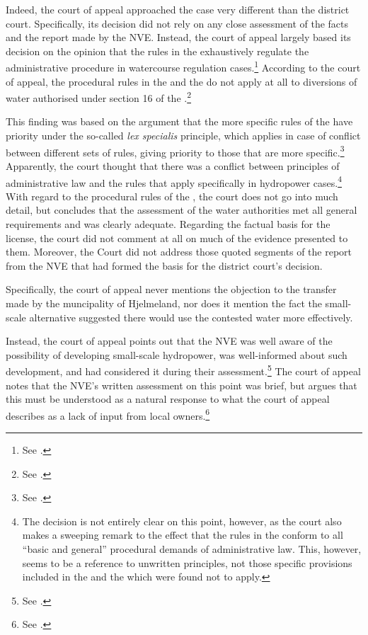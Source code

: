 Indeed, the court of appeal approached the case very different than the district court. Specifically, its decision did not rely on any close assessment of the facts and the report made by the NVE. Instead, the court of appeal largely based its decision on the opinion that the rules in the \cite{wra17} exhaustively regulate the administrative procedure in watercourse regulation cases.\footnote{See \cite[7]{jorpeland11a}.} According to the court of appeal, the procedural rules in the \cite{ea59} and the \cite{paa67} do not apply at all to diversions of water authorised under section 16 of the \cite{wra17}.\footnote{See \cite[7]{jorpeland11a}.} 

This finding was based on the argument that the more specific rules of the \cite{wra17} have priority under the so-called {\it lex specialis} principle, which applies in case of conflict between different sets of rules, giving priority to those that are more specific.\footnote{See \cite[7]{jorpeland11a}.} Apparently, the court thought that there was a conflict between principles of administrative law and the rules that apply specifically in hydropower cases.\footnote{The decision is not entirely clear on this point, however, as the court also makes a sweeping remark to the effect that the rules in the \cite{wra17} conform to all ``basic and general'' procedural demands of administrative law. This, however, seems to be a reference to unwritten principles, not those specific provisions included in the \cite{paa67} and the \cite{ea59} which were found not to apply.} With regard to the procedural rules of the \cite{wra17}, the court does not go into much detail, but concludes that the assessment of the water authorities met all general requirements and was clearly adequate. Regarding the factual basis for the license, the court did not comment at all on much of the evidence presented to them. Moreover, the Court did not address those quoted segments of the report from the NVE that had formed the basis for the district court's decision.

Specifically, the court of appeal never mentions the objection to the transfer made by the muncipality of Hjelmeland, nor does it mention the fact the small-scale alternative suggested there would use the contested water more effectively.

Instead, the court of appeal points out that the NVE was well aware of the possibility of developing small-scale hydropower, was well-informed about such development, and had considered it during their assessment.\footnote{See \cite[9]{jorpeland11a}.} The court of appeal notes that the NVE's written assessment on this point was brief, but argues that this must be understood as a natural response to what the court of appeal describes as a lack of input from local owners.\footnote{See \cite[9]{jorpeland11a}.}

